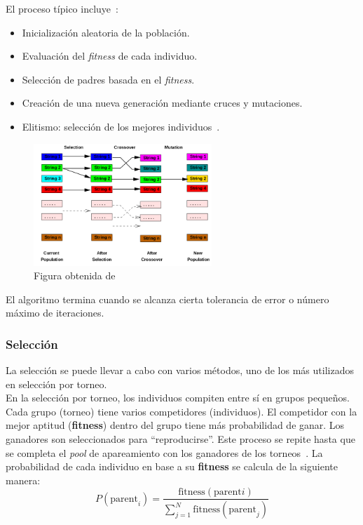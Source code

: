 El proceso típico incluye~\cite{mathew2012genetic}:
\begin{itemize}
    \item Inicialización aleatoria de la población.
    \item Evaluación del \textit{fitness} de cada individuo.
    \item Selección de padres basada en el \textit{fitness}.
    \item Creación de una nueva generación mediante cruces y mutaciones.
    \item Elitismo: selección de los mejores individuos~\cite{mirjalili2019genetic}.
\end{itemize}

\begin{figure}[htp]
    \begin{center}
        \includegraphics[width=0.6\textwidth]{imagenes/ga-working-principle.png}
    \end{center}
    \caption[Funcionamiento de un algoritmo genético]{Figura obtenida de \cite{mathew2012genetic}}
\end{figure}


El algoritmo termina cuando se alcanza cierta tolerancia de error o número máximo de iteraciones.

\subsubsection{Selección}
La selección se puede llevar a cabo con varios métodos, uno de los más utilizados en selección por torneo.\\[6pt]
En la selección por torneo, los individuos compiten entre sí en grupos pequeños. Cada grupo (torneo) tiene varios competidores (individuos). El competidor con la mejor aptitud (\textbf{fitness}) dentro del grupo tiene más probabilidad de ganar. Los ganadores son seleccionados para ``reproducirse''. Este proceso se repite hasta que se completa el \textit{pool} de apareamiento con los ganadores de los torneos~\cite{miller_genetic_nodate}. La probabilidad de cada individuo en base a su \textbf{fitness} se calcula de la siguiente manera:
\begin{equation}
    P(\text{parent}_i) = \frac{\text{fitness}(\text{parent}i)}{\sum_{j=1}^{N} \text{fitness}(\text{parent}_j)}
\end{equation}

